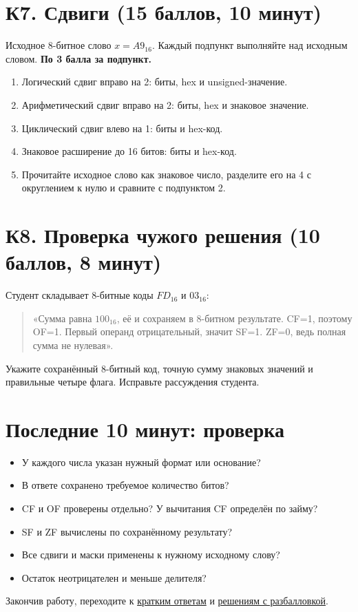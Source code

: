\section{К7. Сдвиги (15 баллов, 10 минут)}\label{task:k7}
Исходное 8-битное слово $x=A9_{16}$. Каждый подпункт выполняйте над исходным словом. \textbf{По 3 балла за подпункт.}
\begin{enumerate}
    \item Логический сдвиг вправо на 2: биты, hex и unsigned-значение.
    \item Арифметический сдвиг вправо на 2: биты, hex и знаковое значение.
    \item Циклический сдвиг влево на 1: биты и hex-код.
    \item Знаковое расширение до 16 битов: биты и hex-код.
    \item Прочитайте исходное слово как знаковое число, разделите его на 4 с округлением к нулю и сравните с подпунктом 2.
\end{enumerate}

\section{К8. Проверка чужого решения (10 баллов, 8 минут)}\label{task:k8}
Студент складывает 8-битные коды $FD_{16}$ и $03_{16}$:

\begin{quote}
«Сумма равна $100_{16}$, её и сохраняем в 8-битном результате. CF=1, поэтому OF=1. Первый операнд отрицательный, значит SF=1. ZF=0, ведь полная сумма не нулевая».
\end{quote}

Укажите сохранённый 8-битный код, точную сумму знаковых значений и правильные четыре флага. Исправьте рассуждения студента.

\section*{Последние 10 минут: проверка}
\begin{itemize}
    \item У каждого числа указан нужный формат или основание?
    \item В ответе сохранено требуемое количество битов?
    \item CF и OF проверены отдельно? У вычитания CF определён по займу?
    \item SF и ZF вычислены по сохранённому результату?
    \item Все сдвиги и маски применены к нужному исходному слову?
    \item Остаток неотрицателен и меньше делителя?
\end{itemize}
Закончив работу, переходите к \hyperref[answers:mock]{кратким ответам} и \hyperref[solutions:mock]{решениям с разбалловкой}.
